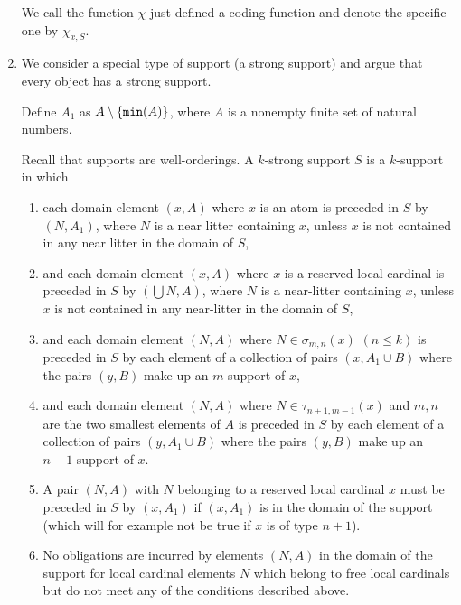 \documentclass[12pt]{article}
\begin{document}
\begin{enumerate}
We call the function $\chi$ just defined a coding function and denote the specific one by $\chi_{x,S}$.

\item We consider a special type of support (a strong support) and argue that every object has a strong support.

Define $A_1$ as $A \setminus \{{\tt min}(A)\}$, where $A$ is a nonempty finite set of natural numbers.

Recall that supports are well-orderings.  A $k$-strong support $S$ is a $k$-support in which 

\begin{enumerate}

\item each domain element $(x,A)$ where $x$ is an atom  is preceded in $S$ by $(N,A_1)$, where $N$ is a near litter containing $x$, unless $x$ is not contained in any near litter in the domain of $S$, 

\item and each domain element $(x,A)$ where $x$ is a reserved local cardinal is preceded in $S$  by $(\bigcup N,A)$, where $N$ is a near-litter containing $x$, unless $x$ is not contained in any near-litter in the domain of $S$, 

\item and each domain element $(N,A)$ where $N \in \sigma_{m,n}(x)$ $(n \leq k)$ is preceded in $S$ by each element of a collection of  pairs $(x,A_1\cup B)$ where the pairs $(y,B)$
make up an $m$-support of $x$, 

\item and each domain element $(N,A)$ where $N \in \tau_{n+1,m-1}(x)$ and $m,n$ are the two smallest elements of $A$ is preceded in $S$ by each element of a collection of  pairs $(y,A_1 \cup B)$ where
the pairs $(y,B)$ make up an $n-1$-support of $x$.  

\item A pair $(N,A)$ with $N$ belonging to a reserved local cardinal $x$ must be preceded in $S$ by $(x,A_1)$ if $(x,A_1)$ is in the domain of the support (which will for example not be true if $x$ is of type $n+1$).  

\item No obligations are incurred by elements $(N,A)$ in the domain of the support for local cardinal elements $N$ which belong to free local cardinals  but do not meet any of the conditions described above.

\end{enumerate}


\end{enumerate}
\end{document}
